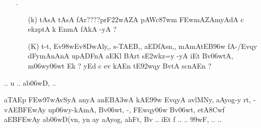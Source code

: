 \def\DevnagVersion{2.15}\documentclass{article}
\begin{document}
\begin{itemize}
\begin{itemize}
               \item[({\dn R})] {\dn EC/E\306wt{\rs -\re}En,SkA@yynAEdk aASy\2 BvtA\2 \3FEwd\?f\? upl<y{\rs -\re}mAn\2 Bv\306wmtAsAr\?Z pyA\0\3D8w\2 n {\rs ?\re}}
                             
               \end{itemize}
               
  \item[{\dn \dnnum \rn{33}}.] \begin{itemize}
  
            \item[({\dn k})] {\dn tAsA\2 tAsA\2 fAr{\rs ????\re}prF\322wAZA\2 pAWc\387wm\? \3FEwmAZAmyA\0dA c ekzptA k\2 EnmA\0\2 fAkA -yA {\rs ?\re}}
            
            \item[({\dn K})] {\dn t\4-t\4, Ev\398wEv\38DwAly\4,{\rs ,\re} s\2-TAEB,{\rs ,\re} aEDfAsn\4,{\rs ,\re} mAmAtEB\396w fA-/Evqy\? dFymAnAnA upADFnA aEKl\? BArt\? s\3E2wkz=y\2 -yA iEt Bv\306wtA, m\306wy\306wt\? Ek {\rs ?\re} yEd c ev kAEn tE\392wqy\? BvtA\2 s\2cnAEn {\rs ?\re} }
  
            \end{itemize}                                           
\end{itemize}

\begin{center}
{\dn .. u .. ab\306wD, ..}
\end{center}

{\dn aTAEp \3FEw\397wAvSyA anyA anEB\3A3wA kA\2E\399w EvqyA avlMNy{\rs ,\re} aAyog-y rt, -vAEB\3FEwAy up\306wy-kAmA, Bv\306wt, -, \3FEw\?qy\306w Bv\306wt, etA\38Cwf aEB\3FEwAy ab\306wD(v\?n{\rs ,\re} y\?n ay aAyog, ahFt, Bv\? .. iEt f .. {\rs *\re} .. \399wF, .. {\rs *\re} ..}
\end{document}
